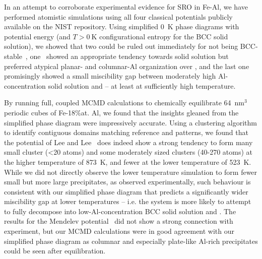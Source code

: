 In an attempt to corroborate experimental evidence for SRO in Fe-Al, we have performed atomistic simulations using all four classical potentials publicly available on the NIST repository.
Using simplified 0~K phase diagrams with potential energy (and $T>0~\mathrm{K}$ configurational entropy for the BCC solid solution), we showed that two could be ruled out immediately for not being BCC-stable~\cite{farkas2020model, jelinek2012modified}, one~\cite{mendelev2005effect} showed an appropriate tendency towards solid solution but preferred atypical planar- and columnar-Al organization over \DOTHREE, and the last one~\cite{lee2010modified} promisingly showed a small miscibility gap between moderately high Al-concentration solid solution and \DOTHREE -- at least at sufficiently high temperature.

By running full, coupled MCMD calculations to chemically equilibrate 64~$\mathrm{nm}^3$ periodic cubes of Fe-18\%at. Al, we found that the insights gleaned from the simplified phase diagram were impressively accurate.
Using a clustering algorithm to identify contiguous domains matching reference \DOTHREE and \BTWO patterns, we found that the potential of Lee and Lee~\cite{lee2010modified} does indeed show a strong tendency to form many small cluster (<20 atoms) and some moderately sized clusters (40-270 atoms) at the higher temperature of 873~K, and fewer at the lower temperature of 523~K.
While we did not directly observe the lower temperature simulation to form fewer small but more large precipitates, as observed experimentally, such behaviour is consistent with our simplified phase diagram that predicts a significantly wider miscibility gap at lower temperatures -- i.e. the system is more likely to attempt to fully decompose into low-Al-concentration BCC solid solution and \DOTHREE.
The results for the Mendelev potential~\cite{mendelev2005effect} did not show a strong connection with experiment, but our MCMD calculations were in good agreement with our simplified phase diagram as columnar and especially plate-like Al-rich precipitates could be seen after equilibration.

